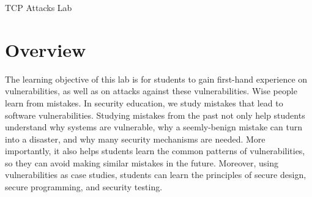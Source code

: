

\newcommand{\commonfolder}{../../common-files}





\newcommand{\telnet} {\texttt{telnet}\xspace}
\newcommand{\tcpFigs}{./Figs}




\setcounter{task}{1}
\newcommand{\mytask} {\bf {\noindent \arabic{task}} \addtocounter{task}{1} \,}



\begin{center}
{\LARGE TCP Attacks Lab}
\end{center}




\section{Overview}


The learning objective of this lab is for students to gain first-hand
experience on vulnerabilities, as well as on attacks against these
vulnerabilities. Wise people learn from mistakes. In security education, we
study mistakes that lead to software vulnerabilities. Studying mistakes
from the past not only help students understand why systems are vulnerable,
why a seemly-benign mistake can turn into a disaster, and why many
security mechanisms are needed. More importantly, it also helps students
learn the common patterns of vulnerabilities, so they can avoid making
similar mistakes in the future. Moreover, using vulnerabilities as case
studies, students can learn the principles of secure design, secure
programming, and security testing.

